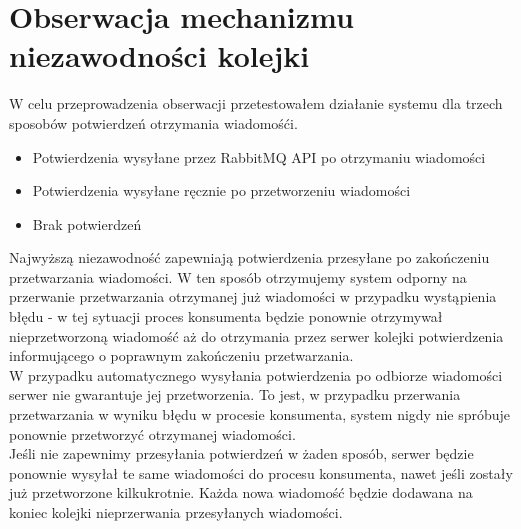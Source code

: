 \documentclass{article}
\begin{document}
    \section{Obserwacja mechanizmu niezawodności kolejki}
        W celu przeprowadzenia obserwacji przetestowałem działanie systemu dla trzech sposobów potwierdzeń otrzymania wiadomośći. 
        \begin{itemize}
            \item Potwierdzenia wysyłane przez RabbitMQ API po otrzymaniu wiadomości
            \item Potwierdzenia wysyłane ręcznie po przetworzeniu wiadomości 
            \item Brak potwierdzeń
        \end{itemize}
        Najwyższą niezawodność zapewniają potwierdzenia przesyłane po zakończeniu przetwarzania wiadomości. W ten sposób otrzymujemy system odporny na przerwanie przetwarzania otrzymanej już wiadomości w przypadku wystąpienia błędu - w tej sytuacji proces konsumenta będzie ponownie otrzymywał nieprzetworzoną wiadomość aż do otrzymania przez serwer kolejki potwierdzenia informującego o poprawnym zakończeniu przetwarzania. \\
        W przypadku automatycznego wysyłania potwierdzenia po odbiorze wiadomości serwer nie gwarantuje jej przetworzenia. To jest, w przypadku przerwania przetwarzania w wyniku błędu w procesie konsumenta, system nigdy nie spróbuje ponownie przetworzyć otrzymanej wiadomości. \\
        Jeśli nie zapewnimy przesyłania potwierdzeń w żaden sposób, serwer będzie ponownie wysyłał te same wiadomości do procesu konsumenta, nawet jeśli zostały już przetworzone kilkukrotnie. Każda nowa wiadomość będzie dodawana na koniec kolejki nieprzerwania przesyłanych wiadomości. 
        
    \section{}
        
        
        
\end{document}
